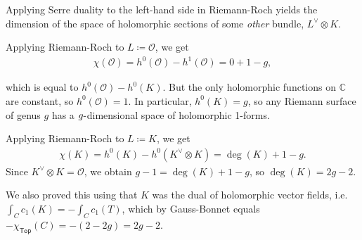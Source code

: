 \begin{remark}

Applying Serre duality to the left-hand side in Riemann-Roch yields the
dimension of the space of holomorphic sections of some \emph{other}
bundle, \(L^\vee\otimes K\).

\end{remark}

\begin{example}

Applying Riemann-Roch to \(L \coloneqq{\mathcal{O}}\), we get
\begin{align*}
\chi({\mathcal{O}}) = h^0({\mathcal{O}}) - h^1({\mathcal{O}}) = 0 + 1 - g
,\end{align*}

which is equal to \(h^0({\mathcal{O}}) - h^0(K)\). But the only
holomorphic functions on \({\mathbb{C}}\) are constant, so
\(h^0({\mathcal{O}}) = 1\). In particular, \(h^0(K) = g\), so any
Riemann surface of genus \(g\) has a \(g{\hbox{-}}\)dimensional space of
holomorphic 1-forms.

\end{example}

\begin{example}

Applying Riemann-Roch to \(L\coloneqq K\), we get
\begin{align*}
\chi(K) = h^0(K) - h^0(K^\vee\otimes K) = \deg(K) + 1 - g
.\end{align*}
Since \(K^\vee\otimes K = {\mathcal{O}}\), we obtain
\(g-1 = \deg(K) + 1 - g\), so \(\deg(K) = 2g-2\).

We also proved this using that \(K\) was the dual of holomorphic vector
fields, i.e.~\(\int_C c_1(K) = -\int_C c_1(T)\), which by Gauss-Bonnet
equals \(-\chi_{\mathsf{Top}}(C) = -(2-2g) = 2g-2\).

\end{example}

